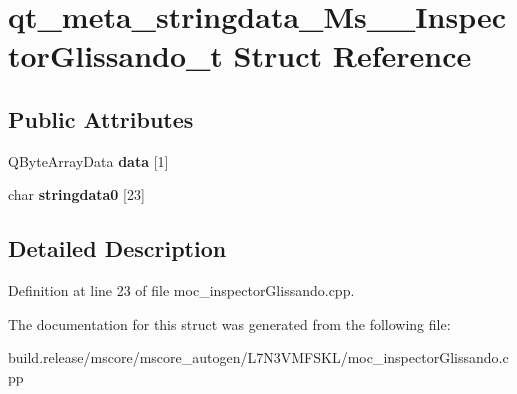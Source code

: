 \hypertarget{structqt__meta__stringdata___ms_____inspector_glissando__t}{}\section{qt\+\_\+meta\+\_\+stringdata\+\_\+\+Ms\+\_\+\+\_\+\+Inspector\+Glissando\+\_\+t Struct Reference}
\label{structqt__meta__stringdata___ms_____inspector_glissando__t}
\subsection*{Public Attributes}
\begin{DoxyCompactItemize}
\item 
\mbox{\label{structqt__meta__stringdata___ms_____inspector_glissando__t_abab784ee25304a1f563dbd30c4f04d74}} 
Q\+Byte\+Array\+Data {\bfseries data} \mbox{[}1\mbox{]}
\item 
\mbox{\label{structqt__meta__stringdata___ms_____inspector_glissando__t_abc17e7336408384f0b47bf76aa4f90a9}} 
char {\bfseries stringdata0} \mbox{[}23\mbox{]}
\end{DoxyCompactItemize}


\subsection{Detailed Description}


Definition at line 23 of file moc\+\_\+inspector\+Glissando.\+cpp.



The documentation for this struct was generated from the following file\+:\begin{DoxyCompactItemize}
\item 
build.\+release/mscore/mscore\+\_\+autogen/\+L7\+N3\+V\+M\+F\+S\+K\+L/moc\+\_\+inspector\+Glissando.\+cpp\end{DoxyCompactItemize}
